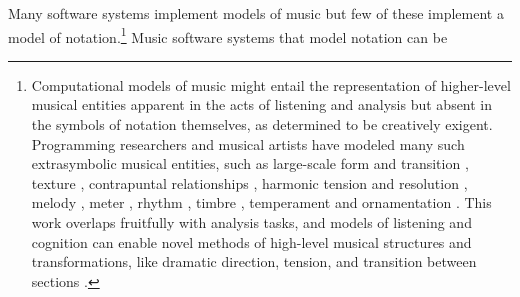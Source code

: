 \documentclass{article}
\begin{document}
Many software systems implement models of music but few of these
implement a model of notation.\footnote{Computational models of music might
entail the representation of higher-level musical entities apparent in the acts
of listening and analysis but absent in the symbols of notation themselves, as
determined to be creatively exigent. Programming researchers and musical
artists have modeled many such extrasymbolic musical entities, such as
large-scale form and transition \cite{polansky1991morphological,
uno1994temporal, dobrian1995algorithmic, abrams1999higher,
Yoo1983}, texture \cite{Horenstein:2004kx}, contrapuntal relationships
\cite{Boenn:2009oq, Bell:1995ij, farbood2001analysis, Cope:2002fv, Laurson:2005dz, Polansky:2011fu, Ebcioglu:1980kl}, harmonic
tension and resolution \cite{Melo2003, Wiggins1999, Foster:1995qa}, melody \cite{Hornel:1993mi, Smith:1992pi}, meter
\cite{Hamanaka:2005ff}, rhythm \cite{Nauert2007, Degazio:1996lh, Collins:2003bs}, timbre \cite{Xenakis:1991fu, Creasey:1996ye, Osaka2004}, temperament \cite{Seymour:2007qo, Graf:2006il} and ornamentation \cite{Ariza:2003zt, Chico-Topfer:1998jl}. This work
overlaps fruitfully with analysis tasks, and models of listening and cognition
can enable novel methods of high-level musical structures and transformations,
like dramatic direction, tension, and transition between sections
\cite{Collins2009}.} Music software systems that model notation can be
\end{document}
